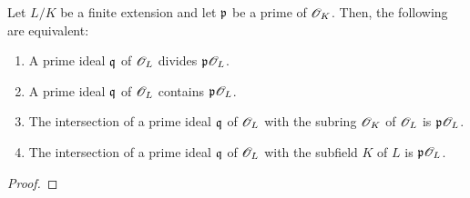                 \begin{lemma}
                    Let $L/K$ be a finite extension and let $\mathfrak{p}$ be a prime of $\mathscr{O}_K$. Then, the following are equivalent:
                        \begin{enumerate}
                            \item A prime ideal $\mathfrak{q}$ of $\mathscr{O}_L$ divides $\mathfrak{p}\mathscr{O}_L$.
                            \item A prime ideal $\mathfrak{q}$ of $\mathscr{O}_L$ contains $\mathfrak{p}\mathscr{O}_L$.
                            \item The intersection of a prime ideal $\mathfrak{q}$ of $\mathscr{O}_L$ with the subring $\mathscr{O}_K$ of $\mathscr{O}_L$ is $\mathfrak{p}\mathscr{O}_L$.
                            \item The intersection of a prime ideal $\mathfrak{q}$ of $\mathscr{O}_L$ with the subfield $K$ of $L$ is $\mathfrak{p}\mathscr{O}_L$.
                        \end{enumerate}
                \end{lemma}
                    \begin{proof}
                        
                    \end{proof}
                    
